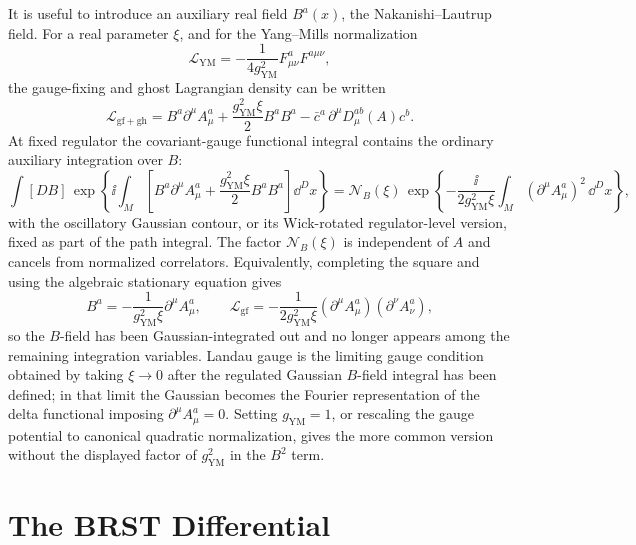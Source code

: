 It is useful to introduce an auxiliary real field \(B^a(x)\), the
Nakanishi--Lautrup field.  For a real parameter \(\xi\), and for the
Yang--Mills normalization
\[
  \mathcal L_{\mathrm{YM}}
  =
  -\frac1{4g_{\mathrm{YM}}^2}F^a_{\mu\nu}F^{a\mu\nu},
\]
the gauge-fixing and ghost Lagrangian density can be written
\begin{equation}
  \mathcal L_{\mathrm{gf+gh}}
  =
  B^a\partial^\mu A_\mu^a
  +\frac{g_{\mathrm{YM}}^2\xi}{2}B^aB^a
  -\bar c^a\,\partial^\mu D_\mu^{ab}(A)c^b .
  \label{eq:gf-ghost-lagrangian}
\end{equation}
At fixed regulator the covariant-gauge functional integral contains the
ordinary auxiliary integration over \(B\):
\begin{equation}
  \int[DB]\,
  \exp\left\{
  \ii\int_M
  \left[
  B^a\partial^\mu A_\mu^a
  +\frac{g_{\mathrm{YM}}^2\xi}{2}B^aB^a
  \right]\dd^D x
  \right\}
  =
  \mathcal N_B(\xi)\,
  \exp\left\{
  -\frac{\ii}{2g_{\mathrm{YM}}^2\xi}
  \int_M(\partial^\mu A_\mu^a)^2\,\dd^D x
  \right\},
  \label{eq:nakanishi-lautrup-gaussian-integral}
\end{equation}
with the oscillatory Gaussian contour, or its Wick-rotated regulator-level
version, fixed as part of the path integral.  The factor
\(\mathcal N_B(\xi)\) is independent of \(A\) and cancels from normalized
correlators.  Equivalently, completing the square and using the algebraic
stationary equation gives
\[
  B^a=-\frac1{g_{\mathrm{YM}}^2\xi}\partial^\mu A_\mu^a,
  \qquad
  \mathcal L_{\mathrm{gf}}
  =
  -\frac1{2g_{\mathrm{YM}}^2\xi}
  (\partial^\mu A_\mu^a)(\partial^\nu A_\nu^a),
\]
so the \(B\)-field has been Gaussian-integrated out and no longer appears
among the remaining integration variables.  Landau gauge is the limiting gauge
condition obtained by taking \(\xi\to0\) after the regulated Gaussian
\(B\)-field integral has been defined; in that limit the Gaussian becomes the
Fourier representation of the delta functional imposing
\(\partial^\mu A_\mu^a=0\).
Setting \(g_{\mathrm{YM}}=1\), or rescaling the gauge potential to canonical
quadratic normalization, gives the more common version without the displayed
factor of \(g_{\mathrm{YM}}^2\) in the \(B^2\) term.

\section{The BRST Differential}

